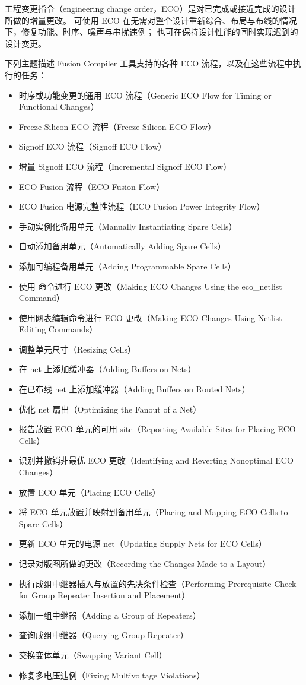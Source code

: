 \label{chap:eco}

工程变更指令（engineering change order，ECO）是对已完成或接近完成的设计所做的增量更改。
可使用 ECO 在无需对整个设计重新综合、布局与布线的情况下，修复功能、时序、噪声与串扰违例；
也可在保持设计性能的同时实现迟到的设计变更。

下列主题描述 Fusion Compiler 工具支持的各种 ECO 流程，以及在这些流程中执行的任务：
\begin{itemize}
  \item 时序或功能变更的通用 ECO 流程（Generic ECO Flow for Timing or Functional Changes）
  \item Freeze Silicon ECO 流程（Freeze Silicon ECO Flow）
  \item Signoff ECO 流程（Signoff ECO Flow）
  \item 增量 Signoff ECO 流程（Incremental Signoff ECO Flow）
  \item ECO Fusion 流程（ECO Fusion Flow）
  \item ECO Fusion 电源完整性流程（ECO Fusion Power Integrity Flow）
  \item 手动实例化备用单元（Manually Instantiating Spare Cells）
  \item 自动添加备用单元（Automatically Adding Spare Cells）
  \item 添加可编程备用单元（Adding Programmable Spare Cells）
  \item 使用  命令进行 ECO 更改（Making ECO Changes Using the eco\_netlist Command）
  \item 使用网表编辑命令进行 ECO 更改（Making ECO Changes Using Netlist Editing Commands）
  \item 调整单元尺寸（Resizing Cells）
  \item 在 net 上添加缓冲器（Adding Buffers on Nets）
  \item 在已布线 net 上添加缓冲器（Adding Buffers on Routed Nets）
  \item 优化 net 扇出（Optimizing the Fanout of a Net）
  \item 报告放置 ECO 单元的可用 site（Reporting Available Sites for Placing ECO Cells）
  \item 识别并撤销非最优 ECO 更改（Identifying and Reverting Nonoptimal ECO Changes）
  \item 放置 ECO 单元（Placing ECO Cells）
  \item 将 ECO 单元放置并映射到备用单元（Placing and Mapping ECO Cells to Spare Cells）
  \item 更新 ECO 单元的电源 net（Updating Supply Nets for ECO Cells）
  \item 记录对版图所做的更改（Recording the Changes Made to a Layout）
  \item 执行成组中继器插入与放置的先决条件检查（Performing Prerequisite Check for Group Repeater Insertion and Placement）
  \item 添加一组中继器（Adding a Group of Repeaters）
  \item 查询成组中继器（Querying Group Repeater）
  \item 交换变体单元（Swapping Variant Cell）
  \item 修复多电压违例（Fixing Multivoltage Violations）
\end{itemize}

